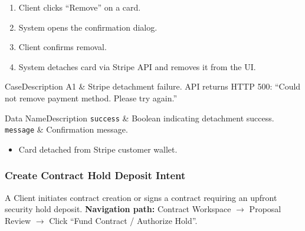 \begin{enumerate}[leftmargin=1.8em,topsep=3pt,itemsep=2pt,parsep=0pt]
      \item Client clicks ``Remove'' on a card.
      \item System opens the confirmation dialog.
      \item Client confirms removal.
      \item System detaches card via Stripe API and removes it from the UI.
\end{enumerate}

\begin{flowtable}{Case}{Description}
      A1 & Stripe detachment failure. API returns HTTP 500: ``Could not remove payment method. Please try again.''\\ \hline
\end{flowtable}

\begin{specdatatable}{Data Name}{Description}
      \texttt{success} & Boolean indicating detachment success.\\ \hline
      \texttt{message} & Confirmation message.\\ \hline
\end{specdatatable}

\begin{itemize}[leftmargin=1.6em,topsep=3pt,itemsep=2pt,parsep=0pt,label=$\bullet$]
      \item Card detached from Stripe customer wallet.
\end{itemize}

\subsubsection{ Create Contract Hold Deposit Intent}

A Client initiates contract creation or signs a contract requiring an upfront security hold deposit.\newline
\textbf{Navigation path:} Contract Workspace $\rightarrow$ Proposal Review $\rightarrow$ Click ``Fund Contract / Authorize Hold''.


